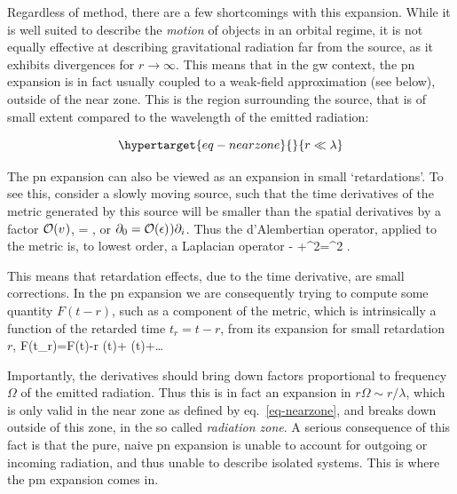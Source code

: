 \documentclass[
  11pt,
  a4paper,
  DIV=11,
  numbers=noendperiod,
  twoside]{scrreprt}
\let\[\relax \let\]\relax %
\DeclareRobustCommand{\[}{\begin{equation}}
\DeclareRobustCommand{\]}{\end{equation}}
\begin{document}
Regardless of method, there are a few shortcomings with this expansion.
While it is well suited to describe the \emph{motion} of objects in an
orbital regime, it is not equally effective at describing gravitational
radiation far from the source, as it exhibits divergences for
\(r\to\infty\). This means that in the \gls{gw} context, the \gls{pn}
expansion is in fact usually coupled to a weak-field approximation (see
below), outside of the near zone. This is the region surrounding the
source, that is of small extent compared to the wavelength of the
emitted radiation:

\begin{equation}\protect\hypertarget{eq-nearzone}{}{
r \ll \lambda
}\label{eq-nearzone}\end{equation}

The \gls{pn} expansion can also be viewed as an expansion in small
`retardations'. To see this, consider a slowly moving source, such that
the time derivatives of the metric generated by this source will be
smaller than the spatial derivatives by a factor \(\mathcal{O}(v^{})\), \[
= ,
\] or \(\partial_0=\mathcal{O}(\epsilon)^{}) \partial_i\). Thus the
d'Alembertian operator, applied to the metric is, to lowest order, a
Laplacian operator \[
- +\nabla^2= \nabla^2 .
\]

This means that retardation effects, due to the time derivative, are
small corrections. In the \gls{pn} expansion we are consequently trying
to compute some quantity \(F(t-r)\), such as a component of the metric,
which is intrinsically a function of the retarded time \(t_r=t-r\), from
its expansion for small retardation \(r\), \[
F(t_r)=F(t)-{r} (t)+ (t)+\ldots
\]

Importantly, the derivatives should bring down factors proportional to
frequency \(\Omega\) of the emitted radiation. Thus this is in fact an
expansion in \(r \Omega\sim r / \lambda\), which is only valid in the
near zone as defined by eq.~\ref{eq-nearzone}, and breaks down outside
of this zone, in the so called \emph{radiation zone}. A serious
consequence of this fact is that the pure, naive \gls{pn} expansion is
unable to account for outgoing or incoming radiation, and thus unable to
describe isolated systems. This is where the \gls{pm} expansion comes
in.
\end{document}
